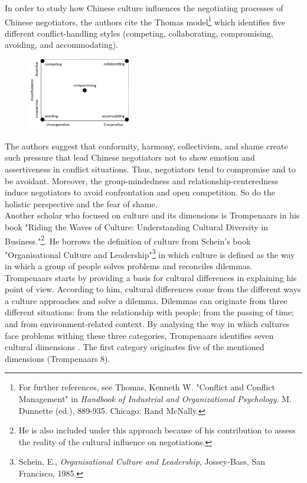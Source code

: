 \documentclass[../main.tex]{subfiles}
\begin{document}
In order to study how Chinese culture influences the negotiating processes of Chinese negotiators, the authors cite the Thomas model\footnote{For further references, see Thomas, Kenneth W. "Conflict and Conflict Management" in \textit{Handbook of Industrial and Organizational Psychology.} M. Dunnette (ed.), 889-935. Chicago: Rand McNally.} which identifies five different conflict-handling styles (competing, collaborating, compromising, avoiding, and accommodating).

\begin{figure}[h]
    \centering\includegraphics[width=0.40\textwidth]{images/thomas.png}
\end{figure}

The authors suggest that conformity, harmony, collectivism, and shame create such pressure that lead Chinese negotiators not to show emotion and assertiveness in conflict situations. Thus, negotiators tend to compromise and to be avoidant. Moreover, the group-mindedness and relationship-centeredness induce negotiators to avoid confrontation and open competition. So do the holistic perspective and the fear of shame.\\

Another scholar who focused on culture and its dimensions is Trompenaars in his book "Riding the Waves of Culture: Understanding Cultural Diversity in Business."\cite{trompenaars}\footnote{He is also included under this approach because of his contribution to assess the reality of the cultural influence on negotiations.}. He borrows the definition of culture from Schein's book "Organisational Culture and Leadership"\footnote{Schein, E., \textit{Organisational Culture and Leadership}, Jossey-Bass, San Francisco, 1985.} in which culture is defined as the way in which a group of people solves problems and reconciles dilemmas. Trompenaars starts by providing a basis for cultural differences in explaining his point of view. According to him, cultural differences come from the different ways a culture approaches and solve a dilemma. Dilemmas can originate from three different situations: from the relationship with people; from the passing of time; and from environment-related context. By analysing the way in which cultures face problems withing these three categories, Trompenaars identifies seven cultural dimensions . The first category originates five of the mentioned dimensions (Trompenaars 8).
\end{document}
